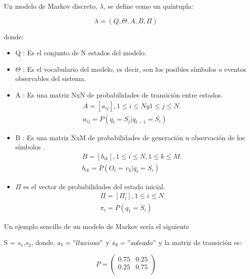 Un modelo de Markov discreto, $\lambda$, se define como un quíntupla:

\begin{equation}
\lambda = (Q,\Theta,A,B,\Pi)
\end{equation}

donde:
 
\begin{itemize}
\item Q :  Es el conjunto de N estados del modelo.
\item $\Theta$ : Es el vocabulario del modelo, es decir, son los posibles s\'imbolos o eventos observables del sistema.
\item A : Es una matriz NxN de probabilidades de transici\'on entre estados.
\begin{equation}
\begin{aligned}
A = [a_{ij}], 1\leq i \leq N  y  1\leq j \leq N.\\
a_{ij} = P(q_{t} = S_{j} | q_{t-1} = S_{i})
\end{aligned}
\end{equation}

\item B : Es una matriz NxM de probabilidades de generaci\'on u observación de los s\'imbolos .
\begin{equation}
\begin{aligned}
B = [b_{ik}], 1\leq i \leq N, 1\leq k \leq M.\\
b_{ik} = P(O_{t} = v_{k} | q_{t} = S_{i})
\end{aligned}
\end{equation}

\item $\Pi$ es el vector de probabilidades del estado inicial.
\begin{equation}
\begin{aligned}
\Pi = [\Pi_{i}], 1\leq i \leq N \\
\pi_{i} = P(q_{1} = S_{i})
\end{aligned}
\end{equation}

\end{itemize}

Un ejemplo sencillo de un modelo de Markov sería el siguiente \cite{ejemploMarkov}

S = {$s_{1}$,$s_{2}$}, donde, $s_{1} = "lluvioso"$ y $s_{2} = "soleado"$ y la matriz de transición es:

\[
 P = \begin{pmatrix}
  0.75 & 0.25  \\
  0.25 & 0.75  \\
 \end{pmatrix}
\]

